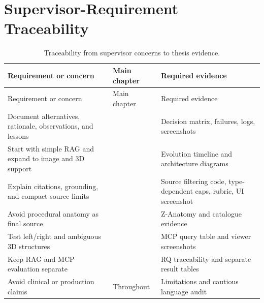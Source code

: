 \chapter{Supervisor-Requirement Traceability}
\label{app:supervisor-traceability}

\begin{longtable}{L{0.31\textwidth}L{0.24\textwidth}L{0.35\textwidth}}
\caption{Traceability from supervisor concerns to thesis evidence.}\\
\toprule
Requirement or concern & Main chapter & Required evidence \\
\midrule
\endfirsthead
\toprule
Requirement or concern & Main chapter & Required evidence \\
\midrule
\endhead
Document alternatives, rationale, observations, and lessons &  & Decision matrix, failures, logs, screenshots \\
Start with simple RAG and expand to image and 3D support &  & Evolution timeline and architecture diagrams \\
Explain citations, grounding, and compact source limits &  & Source filtering code, type-dependent caps, rubric, UI screenshot \\
Avoid procedural anatomy as final source &  & Z-Anatomy and catalogue evidence \\
Test left/right and ambiguous 3D structures &  & MCP query table and viewer screenshots \\
Keep RAG and MCP evaluation separate &  & RQ traceability and separate result tables \\
Avoid clinical or production claims & Throughout & Limitations and cautious language audit \\
\bottomrule
\end{longtable}
